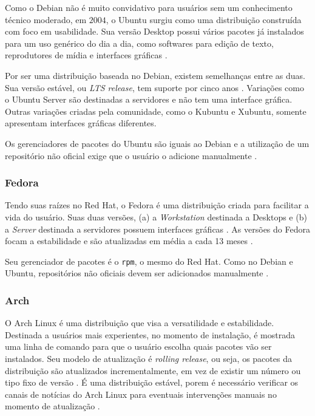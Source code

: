 \documentclass[
article,			%
12pt,				%
openright,			%
oneside,			%
a4paper,			%
chapter=TITLE,		%
section=TITLE,		%
subsection=TITLE,	%
subsubsection=TITLE,%
subsubsubsection=TITLE, %
english,			%
brazil,				%
]{abntex2}
\def\code#1{\texttt{#1}}
\begin{document}
Como o Debian não é muito convidativo para usuários sem um
conhecimento técnico moderado, em $2004$, o Ubuntu surgiu como uma
distribuição construída com foco em usabilidade. Sua versão Desktop
possui vários pacotes já instalados para um uso genérico do dia a dia,
como softwares para edição de texto, reprodutores de mídia e
interfaces gráficas \cite{UbuntuFundation2018}.

Por ser uma distribuição baseada no Debian, existem semelhanças entre
as duas. Sua versão estável, ou \emph{LTS release}, tem suporte por
cinco anos \cite{UbuntuWiki2017}. Variações como o Ubuntu Server são
destinadas a servidores e não tem uma interface gráfica. Outras
variações criadas pela comunidade, como o Kubuntu e Xubuntu, somente
apresentam interfaces gráficas diferentes.

Os gerenciadores de pacotes do Ubuntu são iguais ao Debian e a
utilização de um repositório não oficial exige que o usuário o
adicione manualmente \cite{UbuntuWiki2018}.

\subsubsection{Fedora}

Tendo suas raízes no Red Hat, o Fedora é uma distribuição criada para
facilitar a vida do usuário. Suas duas versões, (a) a
\emph{Workstation} destinada a Desktops e (b) a \emph{Server}
destinada a servidores possuem interfaces gráficas
\cite{FedoraProject2018}. As versões do Fedora focam a estabilidade e
são atualizadas em média a cada 13 meses \cite{FedoraProject2018a}.

Seu gerenciador de pacotes é o \code{rpm}, o mesmo do Red Hat. Como no
Debian e Ubuntu, repositórios não oficiais devem ser adicionados
manualmente \cite{FedoraProject2018b}.

\subsubsection{Arch}

O Arch Linux é uma distribuição que visa a versatilidade e
estabilidade. Destinada a usuários mais experientes, no momento de
instalação, é mostrada uma linha de comando para que o usuário escolha
quais pacotes vão ser instalados. Seu modelo de atualização é
\emph{rolling release}, ou seja, os pacotes da distribuição são
atualizados incrementalmente, em vez de existir um número ou tipo fixo
de versão \cite{ArchWiki2018a}. É uma distribuição estável, porem é
necessário verificar os canais de notícias do Arch Linux para
eventuais intervenções manuais no momento de atualização
\cite{ArchWiki2018c}.
\end{document}

